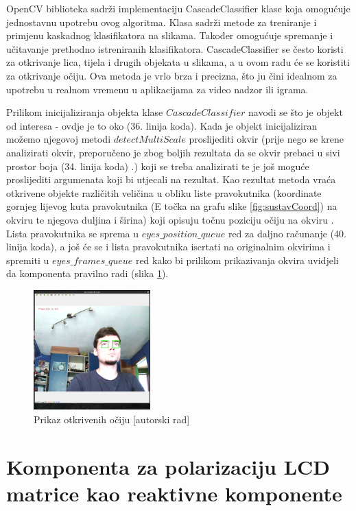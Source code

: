 \documentclass{foi}
\begin{document}
OpenCV biblioteka sadrži implementaciju CascadeClassifier klase koja omogućuje jednostavnu upotrebu ovog algoritma. Klasa sadrži metode za treniranje i primjenu kaskadnog klasifikatora na slikama. Također omogućuje spremanje i učitavanje prethodno istreniranih klasifikatora. CascadeClassifier se često koristi za otkrivanje lica, tijela i drugih objekata u slikama, a u ovom radu će se koristiti za otkrivanje očiju. Ova metoda je vrlo brza i precizna, što ju čini idealnom za upotrebu u realnom vremenu u aplikacijama za video nadzor ili igrama. \cite{OpenCV5}

Prilikom inicijaliziranja objekta klase $CascadeClassifier$ navodi se što je objekt od interesa - ovdje je to oko (36. linija koda). Kada je objekt inicijaliziran možemo njegovoj metodi $detectMultiScale$ proslijediti okvir (prije nego se krene analizirati okvir, preporučeno je zbog boljih rezultata da se okvir prebaci u sivi prostor boja (34. linija koda) \cite{OpenCV5}.) koji se treba analizirati te je još moguće proslijediti argumenata koji bi utjecali na rezultat. Kao rezultat metoda vraća otkrivene objekte različitih veličina u obliku liste pravokutnika (koordinate gornjeg lijevog kuta pravokutnika (E točka na grafu slike \ref{fig:sustavCoord}) na okviru te njegova duljina i širina) koji opisuju točnu poziciju očiju na okviru \cite{OpenCV6}. Lista pravokutnika se sprema u $eyes\_position\_queue$ red za daljno računanje (40. linija koda), a još će se i lista pravokutnika iscrtati na originalnim okvirima i spremiti u $eyes\_frames\_queue$ red kako bi prilikom prikazivanja okvira uvidjeli da komponenta pravilno radi (slika \ref{fig:sustav3}).

\begin{figure}[h!]
    \centering
    \includegraphics[width=0.4\textwidth]{slike/sustav3}
    \caption{Prikaz otkrivenih očiju [autorski rad]}
    \label{fig:sustav3}
\end{figure}

\pagebreak
\section{Komponenta za polarizaciju LCD matrice kao reaktivne komponente}
\end{document}

